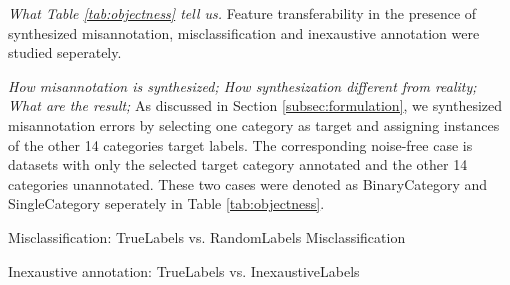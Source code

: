 \noindent \textit{What Table \ref{tab:objectness} tell us.}
\noindent
Feature transferability in the presence of synthesized misannotation, misclassification and inexaustive annotation were studied seperately.

\noindent \textit{
How misannotation is synthesized;
How synthesization different from reality;
What are the result;
}
\noindent
As discussed in Section \ref{subsec:formulation}, we synthesized misannotation errors by selecting one category as target and assigning instances of the other 14 categories target labels.
The corresponding noise-free case is datasets with only the selected target category annotated and the other 14 categories unannotated.
These two cases were denoted as BinaryCategory and SingleCategory seperately in Table \ref{tab:objectness}.


Misclassification: TrueLabels vs. RandomLabels
Misclassification

Inexaustive annotation: TrueLabels vs. InexaustiveLabels

